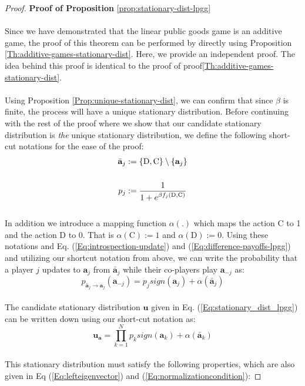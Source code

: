 \documentclass[11pt]{article}
\theoremstyle{plainCl1}
\theoremstyle{plainCl2}
\newcommand{\abf}{\mathbf{a}}
\newcommand{\ubf}{\mathbf{u}}
\newcommand{\C}{\mathrm{C}}
\newcommand{\D}{\mathrm{D}}
\begin{document}
\begin{proof}
\textbf{Proof of Proposition} \ref{prop:stationary-dist-lpgg} \\ \\
Since we have demonstrated that the linear public goods game is an additive game, the proof of this theorem can be performed by directly using Proposition \ref{Th:additive-games-stationary-dist}. Here, we provide an independent proof. The idea behind this proof is identical to the proof of proof\ref{Th:additive-games-stationary-dist}. \\ \\
\noindent Using Proposition \ref{Prop:unique-stationary-dist}, we can confirm that since $\beta$ is finite, the process will have a unique stationary distribution. Before continuing with the rest of the proof where we show that our candidate stationary distribution is \emph{the} unique stationary distribution, we define the following short-cut notations for the ease of the proof: 
\begin{align}
\bar{\abf}_j &:= \{\D,\C\} \setminus \{\abf_j\}  \\ \notag \\ 
p_j &:= \frac{1}{1 + \displaystyle e^{\beta f_j(\D, \C)}} 
\end{align} \\
In addition we introduce a mapping function $\alpha(.)$ which maps the action $\C$ to 1 and the action $\D$ to 0. That is $\alpha(\C) := 1$ and $\alpha(\D) := 0$. Using these notations and Eq. (\ref{Eq:introspection-update}) and (\ref{Eq:difference-payoffs-lpgg}) and utilizing our shortcut notation from above, we can write the probability that a player $j$ updates to $\abf_j$ from $\bar{\abf}_j$ while their co-players play $\abf_{-j}$ as: \\
\begin{equation}
p_{\displaystyle \bar{\abf}_j  \to \abf_j} (\abf_{-j}) = p_j \mathit{sign}(\abf_j) + \alpha(\bar{\abf}_j) 
\end{equation}\\
The candidate stationary distribution $\ubf$ given in Eq. (\ref{Eq:stationary_dist_lpgg}) can be written down using our short-cut notation as: \\
\begin{equation}
\label{Eq:stationary-dist-shortcut}
\ubf_\abf = \prod_{k = 1}^{N}  p_k \mathit{sign}(\abf_k) + \alpha(\bar{\abf}_k)
\end{equation}\\
This stationary distribution must satisfy the following properties, which are also given in Eq  (\ref{Eq:lefteigenvector}) and (\ref{Eq:normalizationcondition}):

\end{proof}
\end{document}
